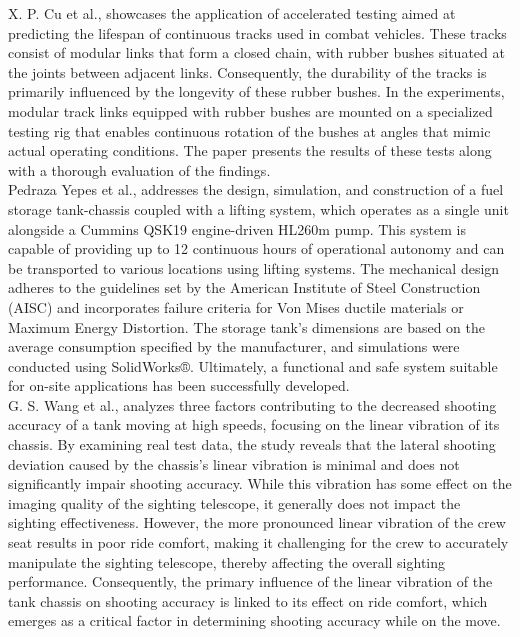 {		X. P. Cu et al., showcases the application of accelerated testing aimed at predicting the lifespan of continuous tracks used in combat vehicles. These tracks consist of modular links that form a closed chain, with rubber bushes situated at the joints between adjacent links. Consequently, the durability of the tracks is primarily influenced by the longevity of these rubber bushes. In the experiments, modular track links equipped with rubber bushes are mounted on a specialized testing rig that enables continuous rotation of the bushes at angles that mimic actual operating conditions. The paper presents the results of these tests along with a thorough evaluation of the findings. \cite{Cu_Xuan}\\
		
		Pedraza Yepes et al., addresses the design, simulation, and construction of a fuel storage tank-chassis coupled with a lifting system, which operates as a single unit alongside a Cummins QSK19 engine-driven HL260m pump. This system is capable of providing up to 12 continuous hours of operational autonomy and can be transported to various locations using lifting systems. The mechanical design adheres to the guidelines set by the American Institute of Steel Construction (AISC) and incorporates failure criteria for Von Mises ductile materials or Maximum Energy Distortion. The storage tank's dimensions are based on the average consumption specified by the manufacturer, and simulations were conducted using SolidWorks®. Ultimately, a functional and safe system suitable for on-site applications has been successfully developed. \cite{Pedraza_Des_2020}\\
		
		G. S. Wang et al., analyzes three factors contributing to the decreased shooting accuracy of a tank moving at high speeds, focusing on the linear vibration of its chassis. By examining real test data, the study reveals that the lateral shooting deviation caused by the chassis's linear vibration is minimal and does not significantly impair shooting accuracy. While this vibration has some effect on the imaging quality of the sighting telescope, it generally does not impact the sighting effectiveness. However, the more pronounced linear vibration of the crew seat results in poor ride comfort, making it challenging for the crew to accurately manipulate the sighting telescope, thereby affecting the overall sighting performance. Consequently, the primary influence of the linear vibration of the tank chassis on shooting accuracy is linked to its effect on ride comfort, which emerges as a critical factor in determining shooting accuracy while on the move. \cite{G_S_Wang}\\
		
}
